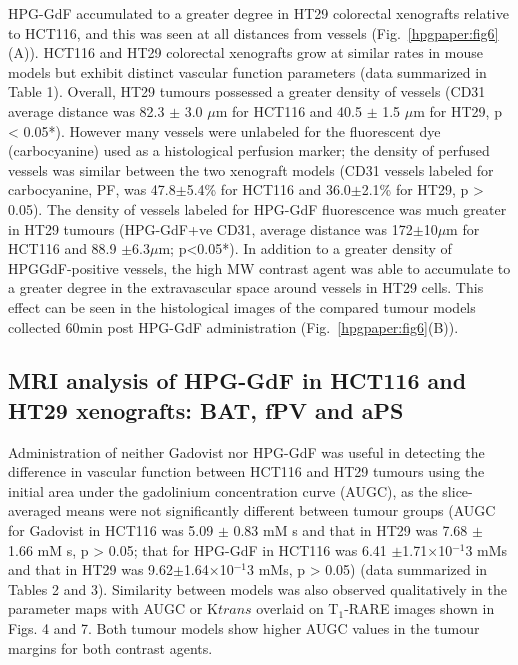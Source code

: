 HPG-GdF accumulated to a greater degree in HT29 colorectal xenografts relative to HCT116, and this was seen at all distances from vessels (Fig.~\ref{hpgpaper:fig6}(A)).
HCT116 and HT29 colorectal xenografts grow at similar rates in mouse models but exhibit distinct vascular function parameters (data summarized in Table 1).
Overall, HT29 tumours possessed a greater density of vessels (CD31 average distance was 82.3 $\pm$ 3.0 $\mu$m for HCT116 and 40.5 $\pm$ 1.5 $\mu$m for HT29, p < 0.05*).
However many vessels were unlabeled for the fluorescent dye (carbocyanine) used as a histological perfusion marker; the density of perfused vessels was similar between the two xenograft models (CD31 vessels labeled for carbocyanine, PF, was 47.8$\pm$5.4\% for HCT116 and 36.0$\pm$2.1\% for HT29, p > 0.05).
The density of vessels labeled for HPG-GdF fluorescence was much greater in HT29 tumours (HPG-GdF+ve CD31, average distance was 172$\pm$10$\mu$m for HCT116 and 88.9 $\pm$6.3$\mu$m; p<0.05*).
In addition to a greater density of HPGGdF-positive vessels, the high MW contrast agent was able to accumulate to a greater degree in the extravascular space around vessels in HT29 cells.
This effect can be seen in the histological images of the compared tumour models collected 60min post HPG-GdF administration (Fig.~\ref{hpgpaper:fig6}(B)).

\subsection{MRI analysis of HPG-GdF in HCT116 and HT29 xenografts: BAT, fPV and aPS}

Administration of neither Gadovist nor HPG-GdF was useful in detecting the difference in vascular function between HCT116 and HT29 tumours using the initial area under the gadolinium concentration curve (AUGC), as the slice-averaged means were not significantly different between tumour groups (AUGC for Gadovist in HCT116 was 5.09 $\pm$ 0.83 mM s and that in HT29 was 7.68 $\pm$ 1.66 mM s, p > 0.05; that for HPG-GdF in HCT116 was 6.41 $\pm$1.71×10$^{-1}$3 mMs and that in HT29 was 9.62$\pm$1.64×10$^{-1}$3 mMs, p > 0.05) (data summarized in Tables 2 and 3).
Similarity between models was also observed qualitatively in the parameter maps with AUGC or K${trans}$ overlaid on T$_1$-RARE images shown in Figs.
4 and 7.
Both tumour models show higher AUGC values in the tumour margins for both contrast agents.

